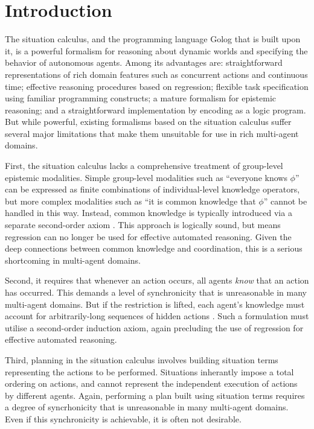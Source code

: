 


\chapter{Introduction}

The situation calculus, and the programming language Golog that is
built upon it, is a powerful formalism for reasoning about dynamic
worlds and specifying the behavior of autonomous agents. Among its
advantages are: straightforward representations of rich domain features
such as concurrent actions and continuous time; effective reasoning
procedures based on regression; flexible task specification using
familiar programming constructs; a mature formalism for epistemic
reasoning; and a straightforward implementation by encoding as a logic
program. But while powerful, existing formalisms based on the situation
calculus suffer several major limitations that make them unsuitable
for use in rich multi-agent domains.

First, the situation calculus lacks a comprehensive treatment of group-level
epistemic modalities. Simple group-level modalities such as {}``everyone
knows $\phi$'' can be expressed as finite combinations of individual-level
knowledge operators, but more complex modalities such as {}``it is
common knowledge that $\phi$'' cannot be handled in this way. Instead,
common knowledge is typically introduced via a separate second-order
axiom \citep{davis05fo_ma_theory,ghaderi07sc_joint_ability}. This
approach is logically sound, but means regression can no longer be
used for effective automated reasoning. Given the deep connections
between common knowledge and coordination, this is a serious shortcoming
in multi-agent domains.

Second, it requires that whenever an action occurs, all agents \emph{know}
that an action has occurred. This demands a level of synchronicity
that is unreasonable in many multi-agent domains. But if the restriction
is lifted, each agent's knowledge must account for arbitrarily-long
sequences of hidden actions \citep{Lesperance99sitcalc_approach}.
Such a formulation must utilise a second-order induction axiom, again
precluding the use of regression for effective automated reasoning.

Third, planning in the situation calculus involves building situation
terms representing the actions to be performed. Situations inherantly
impose a total ordering on actions, and cannot represent the independent
execution of actions by different agents. Again, performing a plan
built using situation terms requires a degree of syncrhonicity that
is unreasonable in many multi-agent domains. Even if this synchronicity
is achievable, it is often not desirable.\\


